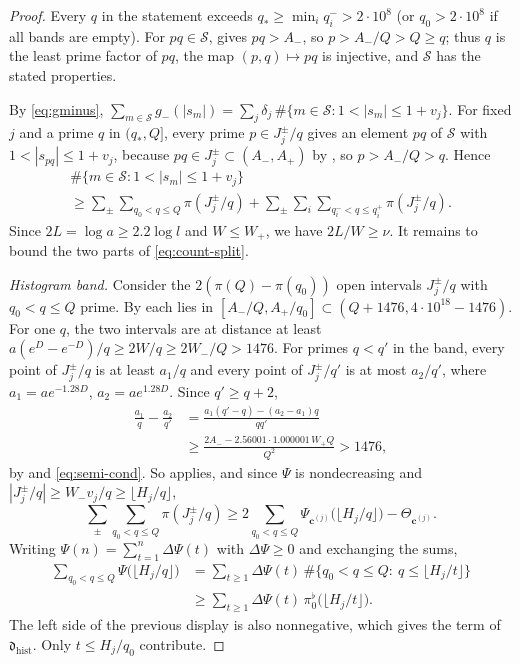 \documentclass[11pt,colorlinks]{charlie}
\newcommand{\cS}{\mathcal S}
\begin{document}
\begin{proof}
Every $q$ in the statement exceeds $q_*\ge\min_iq_i^->2\cdot10^8$ (or $q_0>2\cdot10^8$ if all bands are empty). For $pq\in\cS$,  gives $pq>A_-$, so $p>A_-/Q>Q\ge q$; thus $q$ is the least prime factor of $pq$, the map $(p,q)\mapsto pq$ is injective, and $\cS$ has the stated properties.

By \eqref{eq:gminus}, $\sum_{m\in\cS}g_-(|s_m|)=\sum_j\delta_j\,\#\{m\in\cS:1<|s_m|\le1+v_j\}$. For fixed $j$ and a prime $q$ in $(q_*,Q]$, every prime $p\in J_j^\pm/q$ gives an element $pq$ of $\cS$ with $1<|s_{pq}|\le1+v_j$, because $pq\in J_j^\pm\subset(A_-,A_+)$ by , so $p>A_-/Q>q$. Hence
\begin{multline}\label{eq:count-split}
 \#\{m\in\cS:1<|s_m|\le1+v_j\}\\
 \ge\sum_\pm\sum_{q_0<q\le Q}\pi(J_j^\pm/q)+\sum_\pm\sum_i\sum_{q_i^-<q\le q_i^+}\pi(J_j^\pm/q).
\end{multline}
Since $2L=\log a\ge2.2\log l$ and $W\le W_+$, we have $2L/W\ge\nu$. It remains to bound the two parts of \eqref{eq:count-split}.

\emph{Histogram band.} Consider the $2(\pi(Q)-\pi(q_0))$ open intervals $J_j^\pm/q$ with $q_0<q\le Q$ prime. By  each lies in $[A_-/Q,A_+/q_0]\subset(Q+1476,4\cdot10^{18}-1476)$. For one $q$, the two intervals are at distance at least $a(e^D-e^{-D})/q\ge2W/q\ge2W_-/Q>1476$. For primes $q<q'$ in the band, every point of $J_j^\pm/q$ is at least $a_1/q$ and every point of $J_j^\pm/q'$ is at most $a_2/q'$, where $a_1=ae^{-1.28D}$, $a_2=ae^{1.28D}$. Since $q'\ge q+2$,
\begin{align*}
 \frac{a_1}q-\frac{a_2}{q'}&=\frac{a_1(q'-q)-(a_2-a_1)q}{qq'}\\
 &\ge\frac{2A_--2.56001\cdot1.000001\,W_+Q}{Q^2}>1476,
\end{align*}
by  and \eqref{eq:semi-cond}. So  applies, and since $\Psi$ is nondecreasing and $|J_j^\pm/q|\ge W_-v_j/q\ge\lfloor H_j/q\rfloor$,
\[
 \sum_\pm\sum_{q_0<q\le Q}\pi(J_j^\pm/q)\ge2\sum_{q_0<q\le Q}\Psi_{\mathbf c^{(j)}}\big(\lfloor H_j/q\rfloor\big)-\Theta_{\mathbf c^{(j)}} .
\]
Writing $\Psi(n)=\sum_{t=1}^n\Delta\Psi(t)$ with $\Delta\Psi\ge0$ and exchanging the sums,
\begin{align*}
 \sum_{q_0<q\le Q}\Psi\big(\lfloor H_j/q\rfloor\big)&=\sum_{t\ge1}\Delta\Psi(t)\,\#\{q_0<q\le Q:\ q\le\lfloor H_j/t\rfloor\}\\
 &\ge\sum_{t\ge1}\Delta\Psi(t)\,\pi_0^\flat\big(\lfloor H_j/t\rfloor\big).
\end{align*}
The left side of the previous display is also nonnegative, which gives the term of $\mathfrak d_{\mathrm{hist}}$. Only $t\le H_j/q_0$ contribute.


\end{proof}
\end{document}
